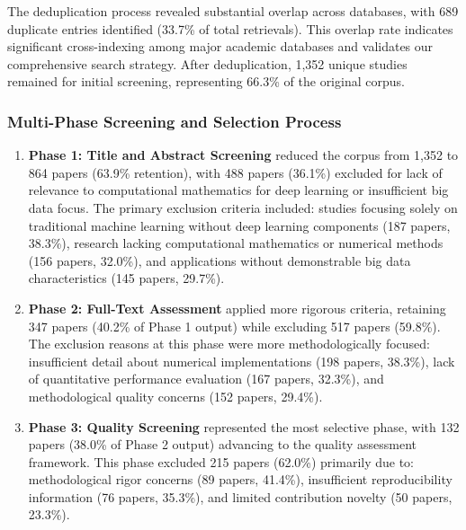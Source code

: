 \documentclass[acmsmall]{acmart}
\begin{document}
The deduplication process revealed substantial overlap across databases, with 689 duplicate entries identified (33.7\% of total retrievals). This overlap rate indicates significant cross-indexing among major academic databases and validates our comprehensive search strategy. After deduplication, 1,352 unique studies remained for initial screening, representing 66.3\% of the original corpus.

\subsubsection{Multi-Phase Screening and Selection Process}\label{subsubsec:phase-2-literature-search-and-study-selection:multi-phase-screening-and-selection-process}



\begin{enumerate}
    \item \textbf{Phase 1: Title and Abstract Screening} reduced the corpus from 1,352 to 864 papers (63.9\% retention), with 488 papers (36.1\%) excluded for lack of relevance to computational mathematics for deep learning or insufficient big data focus. The primary exclusion criteria included: studies focusing solely on traditional machine learning without deep learning components (187 papers, 38.3\%), research lacking computational mathematics or numerical methods (156 papers, 32.0\%), and applications without demonstrable big data characteristics (145 papers, 29.7\%).

    \item \textbf{Phase 2: Full-Text Assessment} applied more rigorous criteria, retaining 347 papers (40.2\% of Phase 1 output) while excluding 517 papers (59.8\%). The exclusion reasons at this phase were more methodologically focused: insufficient detail about numerical implementations (198 papers, 38.3\%), lack of quantitative performance evaluation (167 papers, 32.3\%), and methodological quality concerns (152 papers, 29.4\%).

    \item \textbf{Phase 3: Quality Screening} represented the most selective phase, with 132 papers (38.0\% of Phase 2 output) advancing to the quality assessment framework. This phase excluded 215 papers (62.0\%) primarily due to: methodological rigor concerns (89 papers, 41.4\%), insufficient reproducibility information (76 papers, 35.3\%), and limited contribution novelty (50 papers, 23.3\%).
\end{enumerate}
\end{document}

